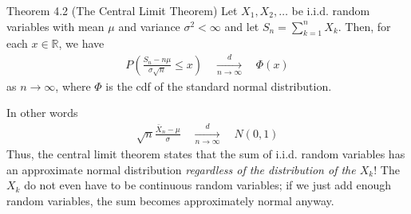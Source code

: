 



\begin{boks}{Theorem 4.2 (The Central Limit Theorem)}
  Let $X_1, X_2, \ldots$ be i.i.d. random variables with mean $\mu$ and variance $\sigma^2 < \infty$ and let $S_n = \sum_{k = 1}^{n} X_k$. Then, for each $x \in \mathbb{R}$, we have
  \begin{align*}
    P\left(\frac{S_n - n\mu}{\sigma \sqrt{n}} \leq x \right) \quad \xrightarrow[n \rightarrow \infty]{d} \quad \Phi(x)
  \end{align*}
  as $n \rightarrow \infty$, where $\Phi$ is the cdf of the standard normal distribution.
\end{boks}
In other words
\begin{align*}
  \sqrt{n}\frac{\bar{X}_n - \mu}{\sigma} \quad \xrightarrow[n \rightarrow \infty]{d} \quad N(0,1)
\end{align*}
Thus, the central limit theorem states that the sum of i.i.d. random variables has an approximate normal distribution \textit{regardless of the distribution of the $X_k$}!
The $X_k$ do not even have to be continuous random variables; if we just add enough random variables, the sum becomes approximately normal anyway.

